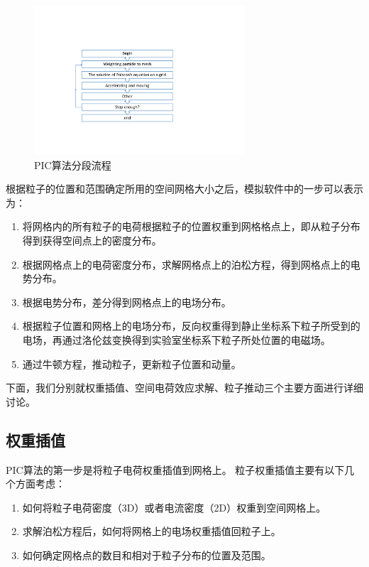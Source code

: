 \begin{figure}[!tbh]
  \centering
    \includegraphics[width=0.7\textwidth]{Img/3_1_PIC2.pdf}
    \caption{PIC算法分段流程}
    \label{fig:PICflow2}
\end{figure}

根据粒子的位置和范围确定所用的空间网格大小之后，模拟软件中的一步可以表示为：
\begin{enumerate}
  \item 将网格内的所有粒子的电荷根据粒子的位置权重到网格格点上，即从粒子分布得到获得空间点上的密度分布。
  \item 根据网格点上的电荷密度分布，求解网格点上的泊松方程，得到网格点上的电势分布。
  \item 根据电势分布，差分得到网格点上的电场分布。
  \item 根据粒子位置和网格上的电场分布，反向权重得到静止坐标系下粒子所受到的电场，再通过洛伦兹变换得到实验室坐标系下粒子所处位置的电磁场。
  \item 通过牛顿方程，推动粒子，更新粒子位置和动量。
\end{enumerate}

下面，我们分别就权重插值、空间电荷效应求解、粒子推动三个主要方面进行详细讨论。

\subsection{权重插值}
PIC算法的第一步是将粒子电荷权重插值到网格上。
粒子权重插值主要有以下几个方面考虑：

\begin{enumerate}
  \item 如何将粒子电荷密度（3D）或者电流密度（2D）权重到空间网格上。
  \item 求解泊松方程后，如何将网格上的电场权重插值回粒子上。
  \item 如何确定网格点的数目和相对于粒子分布的位置及范围。
\end{enumerate}

